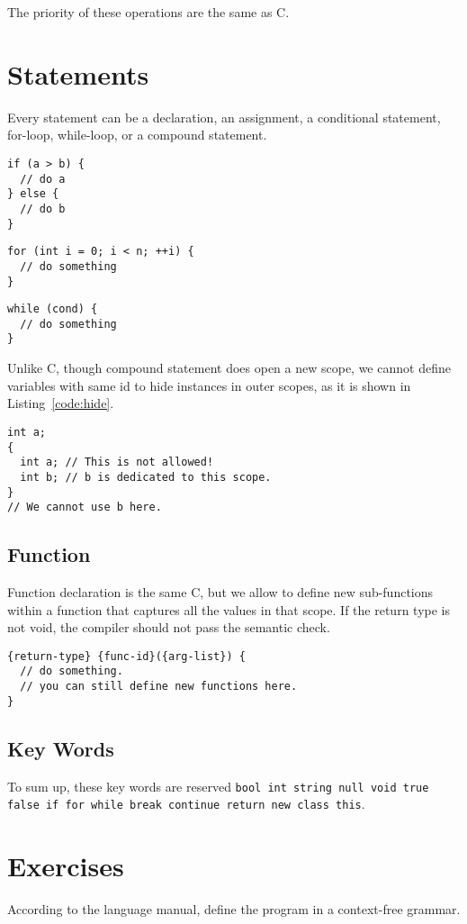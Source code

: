 \documentclass{article}
\begin{document}
The priority of these operations are the same as C.

\section{Statements}

Every statement can be a declaration, an assignment,
a conditional statement, for-loop,
while-loop, or a compound statement.

\begin{lstlisting}[caption=Conditional statement]
if (a > b) {
  // do a
} else {
  // do b
}
\end{lstlisting}

\begin{lstlisting}[caption=For loop]
for (int i = 0; i < n; ++i) {
  // do something
}
\end{lstlisting}

\begin{lstlisting}[caption=While loop]
while (cond) {
  // do something
}
\end{lstlisting}


Unlike C, though compound statement does open a new scope,
we cannot define variables with same id to hide instances in outer scopes,
as it is shown in Listing~\ref{code:hide}.
\begin{lstlisting}[caption=An example of scope\label{code:hide}]
int a;
{
  int a; // This is not allowed!
  int b; // b is dedicated to this scope.
}
// We cannot use b here.
\end{lstlisting}

\subsection{Function}

Function declaration is the same C, but we allow to define new sub-functions
within a function that captures all the values in that scope. If the return
type is not void, the compiler should not pass the semantic check.

\begin{lstlisting}[caption=While loop]
{return-type} {func-id}({arg-list}) {
  // do something.
  // you can still define new functions here.
}
\end{lstlisting}

\subsection{Key Words}

To sum up, these key words are reserved \texttt{bool int string null void true false if for while break continue return new class this}.

\section{Exercises}

According to the language manual, define the program in a context-free grammar.
\end{document}
